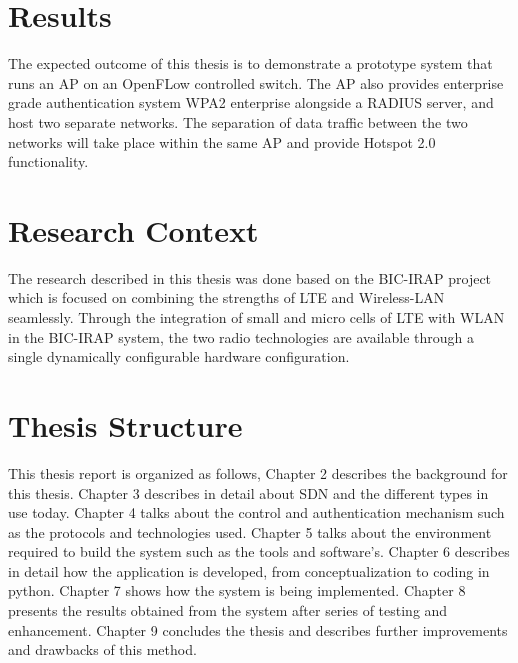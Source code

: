 \section{Results}\label{sec:Results}
The expected outcome of this thesis is to demonstrate a prototype system that runs an AP on an OpenFLow controlled switch. The AP also provides enterprise grade authentication system WPA2 enterprise alongside a RADIUS server, and host two separate networks. The separation of data traffic between the two networks will take place within the same AP and provide Hotspot 2.0 functionality.

\section{Research Context\cite{BIC:IRAP}}\label{sec:BIC-IRAP}
The research described in this thesis was done based on the BIC-IRAP project which is focused on combining the strengths of LTE and Wireless-LAN seamlessly. Through the integration of small and micro cells of LTE with WLAN in the BIC-IRAP system, the two radio technologies are available through a single dynamically configurable hardware configuration.

\section{Thesis Structure}\label{sec:Structure}
This thesis report is organized as follows, Chapter 2 describes the background for this thesis. Chapter 3 describes in detail about SDN and the different types in use today. Chapter 4 talks about the control and authentication mechanism such as the protocols and technologies used. Chapter 5 talks about the environment required to build the system such as the tools and software’s. Chapter 6 describes in detail how the application is developed, from conceptualization to coding in python. Chapter 7 shows how the system is being implemented. Chapter 8 presents the results obtained from the system after series of testing and enhancement. Chapter 9 concludes the thesis and describes further improvements and drawbacks of this method.